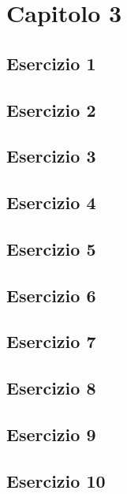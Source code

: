 \section{\textbf{Capitolo 3}}
\subsection{Esercizio 1}

\subsection{Esercizio 2}

\subsection{Esercizio 3}

\subsection{Esercizio 4}

\subsection{Esercizio 5}

\subsection{Esercizio 6}

\subsection{Esercizio 7}

\subsection{Esercizio 8}

\subsection{Esercizio 9}

\subsection{Esercizio 10}
